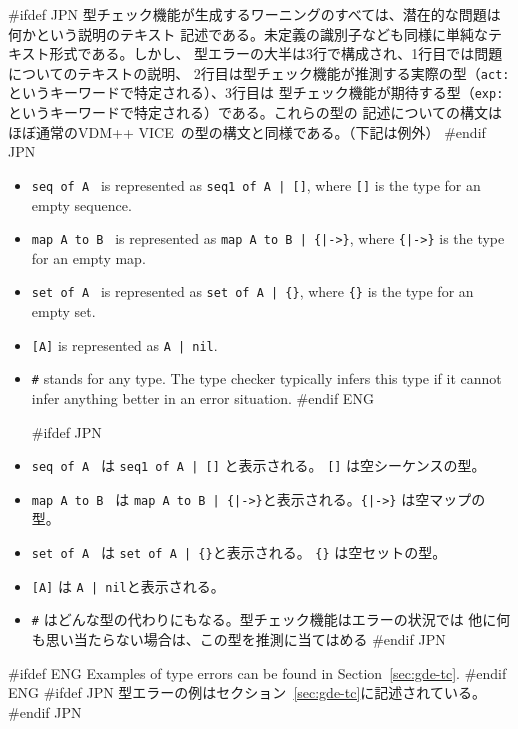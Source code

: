 \documentclass[\pformat,12pt]{article}
\newcommand{\vdmslpp}{VDM-SL}
\newcommand{\vdmslpp}{VDM++}
\renewcommand{\vdmslpp}{VDM++ VICE}
\begin{document}
#ifdef JPN
型チェック機能が生成するワーニングのすべては、潜在的な問題は何かという説明のテキスト
記述である。未定義の識別子なども同様に単純なテキスト形式である。しかし、
型エラーの大半は3行で構成され、1行目では問題についてのテキストの説明、
2行目は型チェック機能が推測する実際の型（\texttt{act:}というキーワードで特定される）、3行目は
型チェック機能が期待する型（\texttt{exp:}というキーワードで特定される）である。これらの型の
記述についての構文はほぼ通常の\vdmslpp\ の型の構文と同様である。（下記は例外）
#endif JPN

\begin{itemize}
#ifdef ENG
\item {\tt seq of A } is represented as {\tt seq1 of A | []}, where
  {\tt []} is the type for an empty sequence.
  
\item {\tt map A to B } is represented as {\tt map A to B | \{|->\}},
  where {\tt \{|->\}} is the type for an empty map.
  
\item {\tt set of A } is represented as {\tt set of A | \{\}}, where
  {\tt \{\}} is the type for an empty set.
  
\item {\tt [A]} is represented as {\tt A | nil}.
  
\item {\tt \#} stands for any type. The type checker typically infers
  this type if it cannot infer anything better in an error situation.
#endif ENG

#ifdef JPN
\item {\tt seq of A } は {\tt seq1 of A | []} と表示される。 {\tt []} は空シーケンスの型。
  
\item {\tt map A to B } は {\tt map A to B | \{|->\}}と表示される。{\tt \{|->\}} は空マップの型。 
  
\item {\tt set of A } は {\tt set of A | \{\}}と表示される。 {\tt \{\}} は空セットの型。
  
\item {\tt [A]} は {\tt A | nil}と表示される。
  
\item {\tt \#} はどんな型の代わりにもなる。型チェック機能はエラーの状況では
  他に何も思い当たらない場合は、この型を推測に当てはめる
#endif JPN
\end{itemize}

#ifdef ENG
Examples of type errors can be found in Section~\ref{sec:gde-tc}.
#endif ENG
#ifdef JPN
型エラーの例はセクション~\ref{sec:gde-tc}に記述されている。
#endif JPN
\end{document}
